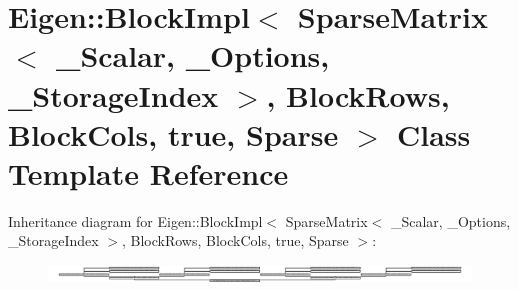 \hypertarget{class_eigen_1_1_block_impl_3_01_sparse_matrix_3_01___scalar_00_01___options_00_01___storage_inded3daac10033a16d6ca9aea81cdfe7eee}{}\section{Eigen\+:\+:Block\+Impl$<$ Sparse\+Matrix$<$ \+\_\+\+Scalar, \+\_\+\+Options, \+\_\+\+Storage\+Index $>$, Block\+Rows, Block\+Cols, true, Sparse $>$ Class Template Reference}
\label{class_eigen_1_1_block_impl_3_01_sparse_matrix_3_01___scalar_00_01___options_00_01___storage_inded3daac10033a16d6ca9aea81cdfe7eee}
Inheritance diagram for Eigen\+:\+:Block\+Impl$<$ Sparse\+Matrix$<$ \+\_\+\+Scalar, \+\_\+\+Options, \+\_\+\+Storage\+Index $>$, Block\+Rows, Block\+Cols, true, Sparse $>$\+:\begin{figure}[H]
\begin{center}
\leavevmode
\includegraphics[height=0.477490cm]{class_eigen_1_1_block_impl_3_01_sparse_matrix_3_01___scalar_00_01___options_00_01___storage_inded3daac10033a16d6ca9aea81cdfe7eee}
\end{center}
\end{figure}
